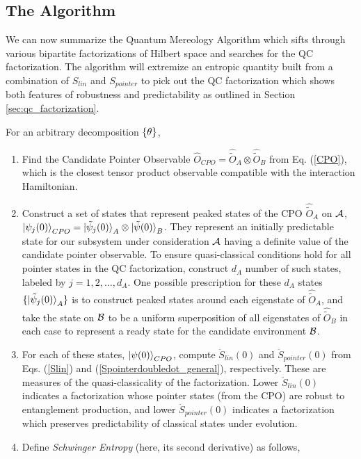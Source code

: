 \documentclass[aps,pra,onecolumn,nofootinbib,notitlepage,11pt,tightenlines]{revtex4-1}
\begin{document}
\subsection{The Algorithm}
\label{subsec:algo}
We can now summarize the Quantum Mereology Algorithm which sifts through various bipartite factorizations of Hilbert space and searches for the QC factorization. The algorithm will extremize an entropic quantity built from a combination of $S_{lin}$ and $S_{pointer}$ to pick out the QC factorization which shows both features of robustness and predictability as outlined in Section \ref{sec:qc_factorization}. 

For an arbitrary decomposition ${\{\theta\}}$,
\begin{enumerate}
\item{Find the Candidate Pointer Observable $\hat{O}_{CPO} = \hat{\tilde{O}}_{A} \otimes \hat{\tilde{O}}_{B} $ from Eq. (\ref{CPO}), which is the closest tensor product observable compatible with the interaction Hamiltonian. }
\item{Construct a set of states that represent peaked states of the CPO $\hat{\tilde{O}}_{A}$ on $\mathcal{A}$, $\ket{\psi_{j}(0)}_{CPO} = \ket{\tilde{\psi}_{j} (0)}_{A} \otimes \ket{\tilde{\psi} (0)}_{B}$. They represent an initially predictable state for our subsystem under consideration $\mathcal{A}$ having a definite value of the candidate pointer observable. To ensure quasi-classical conditions hold for all pointer states in the QC factorization, construct $d_A$ number of such states, labeled by $j = 1,2,\ldots,d_{A}$. One possible prescription for these $d_A$ states $\{\ket{\tilde{\psi}_{j} (0)}_{A}\}$ is to construct peaked states around each eigenstate of $\hat{\tilde{O}}_{A}$, and take the state on $\mathcal{B}$ to be a uniform superposition of all eigenstates of $\hat{\tilde{O}}_{B}$ in each case to represent a ready state for the candidate environment $\mathcal{B}$. }
\item{For each of these states, $\ket{\psi(0)}_{CPO}$, compute $\ddot{S}_{lin}(0)$ and $\ddot{S}_{pointer}(0)$ from Eqs. (\ref{Slin}) and (\ref{Spointerdoubledot_general}), respectively. These are measures of the quasi-classicality of the factorization. Lower $\ddot{S}_{lin}(0)$ indicates a factorization whose pointer states (from the CPO) are robust to entanglement production, and lower $\ddot{S}_{pointer}(0)$ indicates a factorization which preserves predictability of classical states under evolution.}
\item{Define \emph{Schwinger Entropy} (here, its second derivative) as follows,
}
\end{enumerate}
\end{document}
